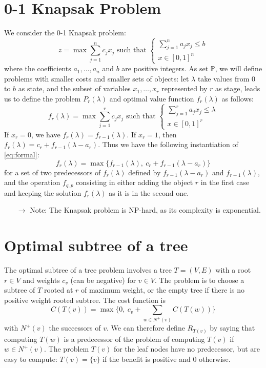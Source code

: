 \documentclass[12pt, openany]{report}
\theoremstyle{definition}
\begin{document}
\section{0-1 Knapsak Problem}
We consider the 0-1 Knapsak problem:
\begin{equation}
    z = \max\sum_{j=1}^n c_jx_j \text{   such that   } \begin{cases}
        \sum_{j=1}^n a_jx_j\le b\\ x\in [0,1]^n
    \end{cases}
\end{equation}
where the coefficients $a_1,\dots,a_n$ and $b$ are positive integers. As set $\mathbb{P}$, we will define problems with smaller costs and smaller sets of objects: let $\lambda$ take values from $0$ to $b$ as state, and the subset of variables $x_1,\dots,x_r$ represented by $r$ as stage, leads us to define the problem $P_r(\lambda)$ and optimal value function $f_r(\lambda)$ as follows:
\begin{equation}
    f_r(\lambda) = \max \sum_{j=1}^r c_jx_j \text{   such that   } \begin{cases}
        \sum_{j=1}^r a_jx_j\le \lambda\\ x\in [0,1]^r
    \end{cases}
\end{equation}
If $x_r=0$, we have $f_r(\lambda)=f_{r-1}(\lambda)$. If $x_r=1$, then $f_r(\lambda) = c_r + f_{r-1}(\lambda - a_r)$. Thus we have the following instantiation of \eqref{eq:formal}:
\begin{equation}
    f_r(\lambda) = \max\{f_{r-1}(\lambda),\:c_r + f_{r-1}(\lambda - a_r)\}
\end{equation}
for a set of two predecessors of $f_r(\lambda)$ defined by $f_{r-1}(\lambda - a_r)$ and $f_{r-1}(\lambda)$, and the operation $f_{q,p}$ consisting in either adding the object $r$ in the first case and keeping the solution $f_r(\lambda)$ as it is in the second one. 
\begin{itemize}
    \item [\(\rightarrow\)] Note: The Knapsak problem is NP-hard, as its complexity is exponential.
\end{itemize}
\section{Optimal subtree of a tree}
The optimal subtree of a tree problem involves a tree $T=(V,E)$ with a root $r\in V$ and weights $c_v$ (can be negative) for $v\in V$. The problem is to choose a subtree of $T$ rooted at $r$ of maximum weight, or the empty tree if there is no positive weight rooted subtree. The cost function is
\begin{equation}
    C(T(v)) = \max\{0, \: c_v+\sum_{w\in N^+(v)} C(T(w))\}
\end{equation}
with $N^+(v)$ the successors of $v$. We can therefore define $R_{T(v)}$ by saying that computing $T(w)$ is a predecessor of the problem of computing $T(v)$ if $w\in N^+(v)$. The problem $T(v)$ for the leaf nodes have no predecessor, but are easy to compute: $T(v)=\{v\}$ if the benefit is positive and 0 otherwise. 
\end{document}
